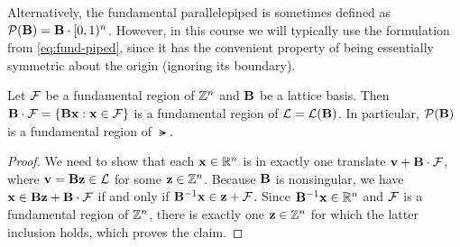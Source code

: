 \documentclass[11pt]{article}
\begin{document}
Alternatively, the fundamental parallelepiped is sometimes defined as
$\mathcal{P}(\mathbf{B}) = \mathbf{B} \cdot [0,1)^n$.  However, in this course we
will typically use the formulation from
\cref{eq:fund-piped}, since it has the convenient property
of being essentially symmetric about the origin (ignoring its
boundary).

\begin{lemma}
  \label{lem:fund-piped-region}
  Let $\mathcal{F}$ be a fundamental region of $\mathbb{Z}^{n}$ and $\mathbf{B}$ be a
  lattice basis.  Then $\mathbf{B} \cdot \mathcal{F} = \{\mathbf{B} \mathbf{x} : \mathbf{x}
    \in \mathcal{F}\}$ is a fundamental region of $\mathcal{L} = \mathcal{L}(\mathbf{B})$.  In
  particular, $\mathcal{P}(\mathbf{B})$ is a fundamental region of $\lat$.
\end{lemma}

\begin{proof}
  We need to show that each $\mathbf{x} \in \mathbb{R}^n$ is in exactly one
  translate $\mathbf{v} + \mathbf{B} \cdot \mathcal{F}$, where
  $\mathbf{v} = \mathbf{B} \mathbf{z} \in \mathcal{L}$ for some $\mathbf{z} \in \mathbb{Z}^{n}$. Because
  $\mathbf{B}$ is nonsingular, we have
  $\mathbf{x} \in \mathbf{B} \mathbf{z} + \mathbf{B} \cdot \mathcal{F}$ if and only if
  $\mathbf{B}^{-1} \mathbf{x} \in \mathbf{z} + \mathcal{F}$. Since
  $\mathbf{B}^{-1} \mathbf{x} \in \mathbb{R}^{n}$ and $\mathcal{F}$ is a fundamental region of
  $\mathbb{Z}^{n}$, there is exactly one $\mathbf{z} \in \mathbb{Z}^{n}$ for which the
  latter inclusion holds, which proves the claim.
\end{proof}
\end{document}
